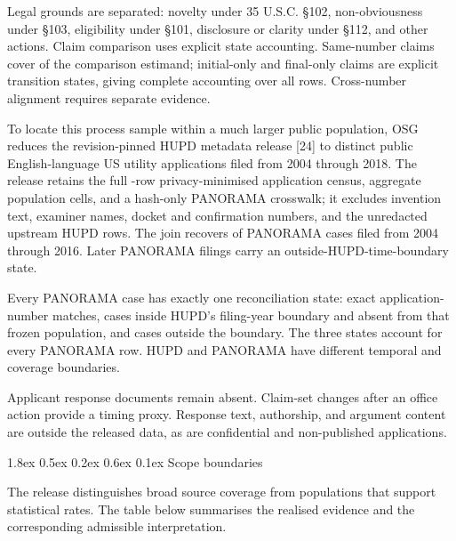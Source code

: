 \documentclass[
  10pt,
]{article}
\makeatletter
\renewcommand\subsubsection{\@startsection{subsubsection}{3}{\z@}%
  {1.8ex \@plus 0.5ex \@minus 0.2ex}%
  {0.6ex \@plus 0.1ex}%
  {\normalfont\normalsize\sffamily\bfseries\color{OSGInk}}}
\makeatother
\begin{document}
Legal grounds are separated: novelty under 35 U.S.C. §102,
non-obviousness under §103, eligibility under §101, disclosure or
clarity under §112, and other actions. Claim comparison uses explicit
state accounting. Same-number claims cover
\OSGClaimPatentClaimAlignmentCoverage{} of the
comparison estimand; \OSGClaimPatentInitialOnlyClaimStates{} initial-only and
\OSGClaimPatentFinalOnlyClaimStates{} final-only claims are
explicit transition states, giving complete accounting over all
\OSGClaimPatentClaimAlignmentRows{}
rows. Cross-number alignment requires separate evidence.

To locate this process sample within a much larger public population,
OSG reduces the revision-pinned HUPD metadata release {[}24{]} to
\OSGClaimHupdPublicApplications{} distinct public English-language US utility
applications filed
from 2004 through 2018. The release retains the full
\OSGClaimHupdPublicApplications{}-row privacy-minimised application census,
\OSGClaimHupdPopulationCells{} aggregate population cells, and a hash-only
PANORAMA crosswalk; it excludes invention text, examiner names, docket
and confirmation numbers, and the unredacted upstream HUPD rows.
The join recovers
\OSGClaimPanoramaHupdOverlapTwoZeroZeroFourTwoZeroOneSixPercent{} of
PANORAMA cases filed from 2004 through 2016. Later PANORAMA filings carry
an outside-HUPD-time-boundary state.

Every PANORAMA case has exactly one reconciliation state:
\OSGClaimPanoramaExactHupdMatches{} exact application-number matches,
\OSGClaimPanoramaWithinHupdYearNonmatches{} cases inside HUPD's filing-year
boundary and absent from that frozen population, and
\OSGClaimPanoramaOutsideHupdYearBoundary{} cases outside the boundary.
The three states account for every PANORAMA row. HUPD and PANORAMA have
different temporal and coverage boundaries.

Applicant response documents remain absent. Claim-set changes after an
office action provide a timing proxy. Response text, authorship, and
argument content are outside the released data, as are confidential and
non-published applications.

\subsubsection{Scope boundaries}\label{scope-boundaries}

The release distinguishes broad source coverage from populations that
support statistical rates. The table below summarises the realised evidence and
the corresponding admissible interpretation.
\end{document}
